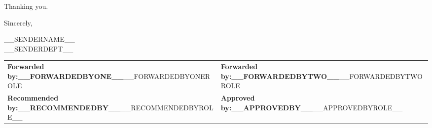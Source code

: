 \documentclass[11pt]{article}
\newcommand{\SenderName}{__SENDERNAME__}
\newcommand{\SenderDept}{__SENDERDEPT__}
\newcommand{\ForwardedByOne}{__FORWARDEDBYONE__}
\newcommand{\ForwardedByOneRole}{__FORWARDEDBYONEROLE__}
\newcommand{\ForwardedByTwo}{__FORWARDEDBYTWO__}
\newcommand{\ForwardedByTwoRole}{__FORWARDEDBYTWOROLE__}
\newcommand{\RecommendedBy}{__RECOMMENDEDBY__}
\newcommand{\RecommendedByRole}{__RECOMMENDEDBYROLE__}
\newcommand{\ApprovedBy}{__APPROVEDBY__}
\newcommand{\ApprovedByRole}{__APPROVEDBYROLE__}
\begin{document}
\noindent Thanking you.

\vspace{1em}

\noindent Sincerely,

\vspace{1em}

\noindent \SenderName\\
\SenderDept

\vspace{1.2em}

\noindent\renewcommand{\arraystretch}{1.4}%
\begin{tabularx}{\textwidth}{X X}
\textbf{Forwarded by:}\newline \textbf{\ForwardedByOne}\newline \ForwardedByOneRole &
\textbf{Forwarded by:}\newline \textbf{\ForwardedByTwo}\newline \ForwardedByTwoRole \\[1em]
\textbf{Recommended by:}\newline \textbf{\RecommendedBy}\newline \RecommendedByRole &
\textbf{Approved by:}\newline \textbf{\ApprovedBy}\newline \ApprovedByRole \\
\end{tabularx}
\end{document}
